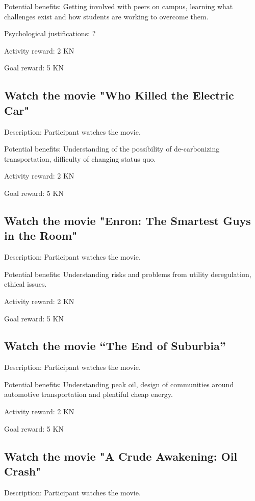 Potential benefits: Getting involved with peers on campus, learning what challenges exist and how students are working to overcome them.

Psychological justifications: ?

Activity reward: 2 KN

Goal reward: 5 KN

\subsection{Watch the movie "Who Killed the Electric Car"}

Description: Participant watches the movie.

Potential benefits: Understanding of the possibility of de-carbonizing transportation, difficulty of changing status quo.

Activity reward: 2 KN

Goal reward: 5 KN

\subsection{Watch the movie "Enron: The Smartest Guys in the Room"}

Description: Participant watches the movie.

Potential benefits: Understanding risks and problems from utility deregulation, ethical issues.

Activity reward: 2 KN

Goal reward: 5 KN

\subsection[Watch the movie ``The End of Suburbia'']{Watch the movie ``The End of Suburbia''}

Description: Participant watches the movie.

Potential benefits: Understanding peak oil, design of communities around automotive transportation and plentiful cheap energy.

Activity reward: 2 KN

Goal reward: 5 KN

\subsection{Watch the movie "A Crude Awakening: Oil Crash"}

Description: Participant watches the movie.

